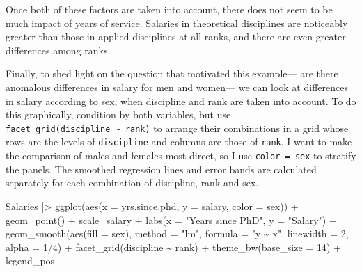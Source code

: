 \documentclass[
  letterpaper,
  10pt,
  krantz2]{krantz}
\makeatletter
\newenvironment{Shaded}{\begin{snugshade}}{\end{snugshade}}
\newcommand{\AttributeTok}[1]{\textcolor[rgb]{0.40,0.45,0.13}{#1}}
\newcommand{\DecValTok}[1]{\textcolor[rgb]{0.68,0.00,0.00}{#1}}
\newcommand{\FunctionTok}[1]{\textcolor[rgb]{0.28,0.35,0.67}{#1}}
\newcommand{\NormalTok}[1]{\textcolor[rgb]{0.00,0.23,0.31}{#1}}
\newcommand{\SpecialCharTok}[1]{\textcolor[rgb]{0.37,0.37,0.37}{#1}}
\newcommand{\StringTok}[1]{\textcolor[rgb]{0.13,0.47,0.30}{#1}}
\newenvironment{kframe}{%
  \medskip{}
  \setlength{\fboxsep}{.8em}
  \def\at@end@of@kframe{}%
  \ifinner\ifhmode%
  \def\at@end@of@kframe{\end{minipage}}%
  \begin{minipage}{\columnwidth}%
  \fi\fi%
  \def\FrameCommand##1{\hskip\@totalleftmargin \hskip-\fboxsep
  \colorbox{shadecolor}{##1}\hskip-\fboxsep
      \hskip-\linewidth \hskip-\@totalleftmargin \hskip\columnwidth}%
  \MakeFramed {\advance\hsize-\width
    \@totalleftmargin\z@ \linewidth\hsize
    \@setminipage}}%
{\par\unskip\endMakeFramed%
  \at@end@of@kframe}
\renewenvironment{Shaded}{\begin{kframe}}{\end{kframe}}
\makeatother
\begin{document}
Once both of these factors are taken into account, there does not seem
to be much impact of years of service. Salaries in theoretical
disciplines are noticeably greater than those in applied disciplines at
all ranks, and there are even greater differences among ranks.

Finally, to shed light on the question that motivated this example---
are there anomalous differences in salary for men and women--- we can
look at differences in salary according to sex, when discipline and rank
are taken into account. To do this graphically, condition by both
variables, but use
\texttt{facet\_grid(discipline\ \textasciitilde{}\ rank)} to arrange
their combinations in a grid whose rows are the levels of
\texttt{discipline} and columns are those of \texttt{rank}. I want to
make the comparison of males and females most direct, so I use
\texttt{color\ =\ sex} to stratify the panels. The smoothed regression
lines and error bands are calculated separately for each combination of
discipline, rank and sex.

\begin{Shaded}
\begin{Highlighting}[]
\NormalTok{Salaries }\SpecialCharTok{|\textgreater{}}
  \FunctionTok{ggplot}\NormalTok{(}\FunctionTok{aes}\NormalTok{(}\AttributeTok{x =}\NormalTok{ yrs.since.phd, }\AttributeTok{y =}\NormalTok{ salary, }\AttributeTok{color =}\NormalTok{ sex)) }\SpecialCharTok{+}
  \FunctionTok{geom\_point}\NormalTok{() }\SpecialCharTok{+}
\NormalTok{  scale\_salary }\SpecialCharTok{+}
  \FunctionTok{labs}\NormalTok{(}\AttributeTok{x =} \StringTok{"Years since PhD"}\NormalTok{,}
       \AttributeTok{y =} \StringTok{"Salary"}\NormalTok{) }\SpecialCharTok{+}
  \FunctionTok{geom\_smooth}\NormalTok{(}\FunctionTok{aes}\NormalTok{(}\AttributeTok{fill =}\NormalTok{ sex),}
              \AttributeTok{method =} \StringTok{"lm"}\NormalTok{, }\AttributeTok{formula =} \StringTok{"y \textasciitilde{} x"}\NormalTok{,}
              \AttributeTok{linewidth =} \DecValTok{2}\NormalTok{, }\AttributeTok{alpha =} \DecValTok{1}\SpecialCharTok{/}\DecValTok{4}\NormalTok{) }\SpecialCharTok{+}
  \FunctionTok{facet\_grid}\NormalTok{(discipline }\SpecialCharTok{\textasciitilde{}}\NormalTok{ rank) }\SpecialCharTok{+}
  \FunctionTok{theme\_bw}\NormalTok{(}\AttributeTok{base\_size =} \DecValTok{14}\NormalTok{) }\SpecialCharTok{+} 
\NormalTok{  legend\_pos}
\end{Highlighting}
\end{Shaded}
\end{document}

